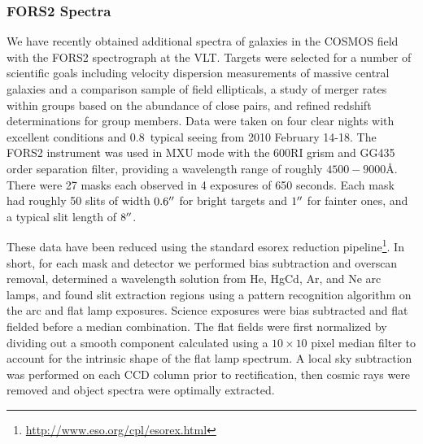 \subsubsection{FORS2 Spectra}
\label{cat_s:fors2}
We have recently obtained additional spectra of galaxies in the COSMOS
field with the FORS2 spectrograph at the VLT. Targets were selected
for a number of scientific goals including velocity dispersion
measurements of massive central galaxies and a comparison sample of field ellipticals, a
study of merger rates within groups based on the abundance of close
pairs, and refined redshift determinations for 
group members. Data were taken on four clear nights with excellent
conditions and 0.8\arcsec\ typical seeing from 2010 February 14-18. The
FORS2 instrument was used in MXU mode with the 600RI grism and GG435
order separation filter, providing a wavelength range of roughly
$4500-9000$\AA. There were 27 masks each observed in 4 exposures of
650 seconds. Each mask had roughly 50 slits of width $0.6\mbox{$^{\prime\prime}$}$ for
bright targets and $1\mbox{$^{\prime\prime}$}$ for fainter ones, and a typical slit
length of $8\mbox{$^{\prime\prime}$}$.

These data have been reduced using the standard {\sc esorex} reduction
pipeline\footnote{\url{http://www.eso.org/cpl/esorex.html}}. In short, for
each mask and detector we performed bias subtraction and overscan
removal, determined a wavelength solution from He, HgCd, Ar, and Ne arc
lamps, and found slit extraction regions using a pattern recognition
algorithm on the arc and flat lamp exposures. Science exposures were
bias subtracted and flat fielded before a median combination. The flat
fields were first normalized by dividing out a smooth component
calculated using a $10\times10$ pixel median filter to account for the
intrinsic shape of the flat lamp spectrum. A local sky subtraction was
performed on each CCD column prior to rectification, then cosmic rays
were removed and object spectra were optimally extracted. 

